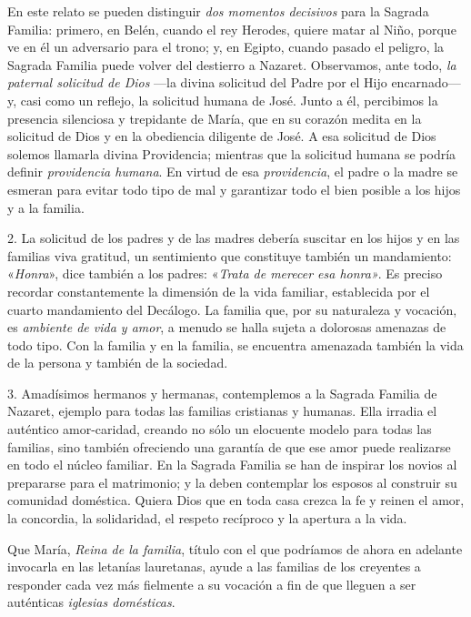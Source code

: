 \documentclass[]{article}
\begin{document}
En este relato se pueden distinguir \emph{dos momentos decisivos} para
la Sagrada Familia: primero, en Belén, cuando el rey Herodes, quiere
matar al Niño, porque ve en él un adversario para el trono; y, en
Egipto, cuando pasado el peligro, la Sagrada Familia puede volver del
destierro a Nazaret. Observamos, ante todo, \emph{la paternal solicitud
de Dios} ---la divina solicitud del Padre por el Hijo encarnado--- y,
casi como un reflejo, la solicitud humana de José. Junto a él,
percibimos la presencia silenciosa y trepidante de María, que en su
corazón medita en la solicitud de Dios y en la obediencia diligente de
José. A esa solicitud de Dios solemos llamarla divina Providencia;
mientras que la solicitud humana se podría definir \emph{providencia
humana}. En virtud de esa \emph{providencia}, el padre o la madre se
esmeran para evitar todo tipo de mal y garantizar todo el bien posible a
los hijos y a la familia.

2. La solicitud de los padres y de las madres debería suscitar en los
hijos y en las familias viva gratitud, un sentimiento que constituye
también un mandamiento: «\emph{Honra}», dice también a los padres:
«\emph{Trata de merecer esa honra»}. Es preciso recordar constantemente
la dimensión de la vida familiar, establecida por el cuarto mandamiento
del Decálogo. La familia que, por su naturaleza y vocación, es
\emph{ambiente de vida y amor}, a menudo se halla sujeta a dolorosas
amenazas de todo tipo. Con la familia y en la familia, se encuentra
amenazada también la vida de la persona y también de la sociedad.

3. Amadísimos hermanos y hermanas, contemplemos a la Sagrada Familia de
Nazaret, ejemplo para todas las familias cristianas y humanas. Ella
irradia el auténtico amor-caridad, creando no sólo un elocuente modelo
para todas las familias, sino también ofreciendo una garantía de que ese
amor puede realizarse en todo el núcleo familiar. En la Sagrada Familia
se han de inspirar los novios al prepararse para el matrimonio; y la
deben contemplar los esposos al construir su comunidad doméstica. Quiera
Dios que en toda casa crezca la fe y reinen el amor, la concordia, la
solidaridad, el respeto recíproco y la apertura a la vida.

Que María, \emph{Reina de la familia}, título con el que podríamos de
ahora en adelante invocarla en las letanías lauretanas, ayude a las
familias de los creyentes a responder cada vez más fielmente a su
vocación a fin de que lleguen a ser auténticas \emph{iglesias
domésticas}.
\end{document}
